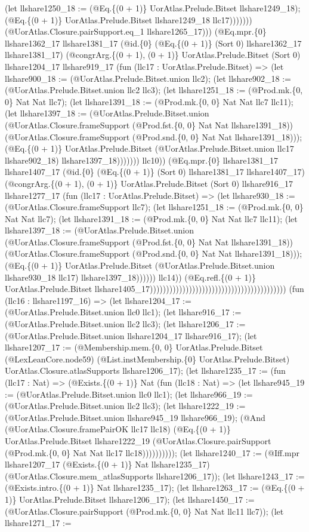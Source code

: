 \documentclass[11pt]{article}
\begin{document}
(let llshare1250\_18 := (@Eq.\{(0 + 1)\} UorAtlas.Prelude.Bitset llshare1249\_18); (@Eq.\{(0 + 1)\} UorAtlas.Prelude.Bitset llshare1249\_18 llc17))))))) (@UorAtlas.Closure.pairSupport.eq\_1 llshare1265\_17))) (@Eq.mpr.\{0\} llshare1362\_17 llshare1381\_17 (@id.\{0\} (@Eq.\{(0 + 1)\} (Sort 0) llshare1362\_17 llshare1381\_17) (@congrArg.\{(0 + 1), (0 + 1)\} UorAtlas.Prelude.Bitset (Sort 0) llshare1204\_17 llshare919\_17 (fun (llc17 : UorAtlas.Prelude.Bitset) => (let llshare900\_18 := (@UorAtlas.Prelude.Bitset.union llc2); (let llshare902\_18 := (@UorAtlas.Prelude.Bitset.union llc2 llc3); (let llshare1251\_18 := (@Prod.mk.\{0, 0\} Nat Nat llc7); (let llshare1391\_18 := (@Prod.mk.\{0, 0\} Nat Nat llc7 llc11); (let llshare1397\_18 := (@UorAtlas.Prelude.Bitset.union (@UorAtlas.Closure.frameSupport (@Prod.fst.\{0, 0\} Nat Nat llshare1391\_18)) (@UorAtlas.Closure.frameSupport (@Prod.snd.\{0, 0\} Nat Nat llshare1391\_18))); (@Eq.\{(0 + 1)\} UorAtlas.Prelude.Bitset (@UorAtlas.Prelude.Bitset.union llc17 llshare902\_18) llshare1397\_18))))))) llc10)) (@Eq.mpr.\{0\} llshare1381\_17 llshare1407\_17 (@id.\{0\} (@Eq.\{(0 + 1)\} (Sort 0) llshare1381\_17 llshare1407\_17) (@congrArg.\{(0 + 1), (0 + 1)\} UorAtlas.Prelude.Bitset (Sort 0) llshare916\_17 llshare1277\_17 (fun (llc17 : UorAtlas.Prelude.Bitset) => (let llshare930\_18 := (@UorAtlas.Closure.frameSupport llc7); (let llshare1251\_18 := (@Prod.mk.\{0, 0\} Nat Nat llc7); (let llshare1391\_18 := (@Prod.mk.\{0, 0\} Nat Nat llc7 llc11); (let llshare1397\_18 := (@UorAtlas.Prelude.Bitset.union (@UorAtlas.Closure.frameSupport (@Prod.fst.\{0, 0\} Nat Nat llshare1391\_18)) (@UorAtlas.Closure.frameSupport (@Prod.snd.\{0, 0\} Nat Nat llshare1391\_18))); (@Eq.\{(0 + 1)\} UorAtlas.Prelude.Bitset (@UorAtlas.Prelude.Bitset.union llshare930\_18 llc17) llshare1397\_18)))))) llc14)) (@Eq.refl.\{(0 + 1)\} UorAtlas.Prelude.Bitset llshare1405\_17)))))))))))))))))))))))))))))))))))))))))) (fun (llc16 : llshare1197\_16) => (let llshare1204\_17 := (@UorAtlas.Prelude.Bitset.union llc0 llc1); (let llshare916\_17 := (@UorAtlas.Prelude.Bitset.union llc2 llc3); (let llshare1206\_17 := (@UorAtlas.Prelude.Bitset.union llshare1204\_17 llshare916\_17); (let llshare1207\_17 := (@Membership.mem.\{0, 0\} UorAtlas.Prelude.Bitset (@LexLeanCore.node59) (@List.instMembership.\{0\} UorAtlas.Prelude.Bitset) UorAtlas.Closure.atlasSupports llshare1206\_17); (let llshare1235\_17 := (fun (llc17 : Nat) => (@Exists.\{(0 + 1)\} Nat (fun (llc18 : Nat) => (let llshare945\_19 := (@UorAtlas.Prelude.Bitset.union llc0 llc1); (let llshare966\_19 := (@UorAtlas.Prelude.Bitset.union llc2 llc3); (let llshare1222\_19 := (@UorAtlas.Prelude.Bitset.union llshare945\_19 llshare966\_19); (@And (@UorAtlas.Closure.framePairOK llc17 llc18) (@Eq.\{(0 + 1)\} UorAtlas.Prelude.Bitset llshare1222\_19 (@UorAtlas.Closure.pairSupport (@Prod.mk.\{0, 0\} Nat Nat llc17 llc18)))))))))); (let llshare1240\_17 := (@Iff.mpr llshare1207\_17 (@Exists.\{(0 + 1)\} Nat llshare1235\_17) (@UorAtlas.Closure.mem\_atlasSupports llshare1206\_17)); (let llshare1243\_17 := (@Exists.intro.\{(0 + 1)\} Nat llshare1235\_17); (let llshare1263\_17 := (@Eq.\{(0 + 1)\} UorAtlas.Prelude.Bitset llshare1206\_17); (let llshare1450\_17 := (@UorAtlas.Closure.pairSupport (@Prod.mk.\{0, 0\} Nat Nat llc11 llc7)); (let llshare1271\_17 := 
\end{document}
